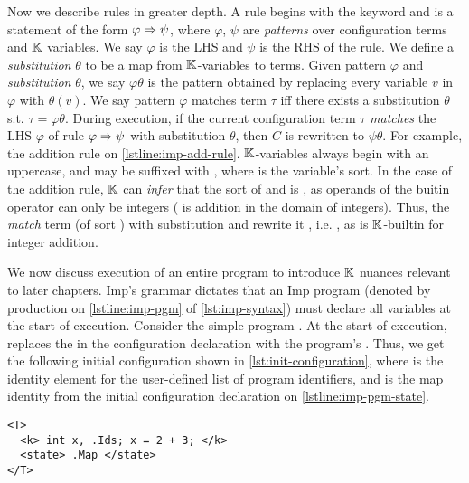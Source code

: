 Now we describe rules in greater depth.
A rule begins with the keyword 
and is a statement of the form $\varphi \Rightarrow \psi$, where
$\varphi$, $\psi$ are \emph{patterns} over configuration terms and $\mathbb{K}$ variables.
We say $\varphi$ is the LHS and $\psi$ is the RHS of the rule.
We define a \emph{substitution} $\theta$ to be a map from $\mathbb{K}$-variables to terms.
Given pattern $\varphi$ and \emph{substitution} $\theta$, we say
$\varphi\theta$ is the pattern obtained by replacing every variable $v$ in
$\varphi$ with $\theta(v)$. We say pattern $\varphi$ matches
term $\tau$ iff there exists a substitution $\theta$ s.t. $\tau = \varphi\theta$.
During execution, if the current configuration term
$\tau$ \emph{matches} the LHS $\varphi$ of rule $\varphi \Rightarrow \psi$
with substitution $\theta$, then $C$ is rewritten to $\psi\theta$.
For example, the addition rule on \autoref{lstline:imp-add-rule}.
$\mathbb{K}$-variables always begin with an uppercase, and may be suffixed with
, where  is the variable's sort. In the case
of the addition rule, $\mathbb{K}$ can \emph{infer} that the sort of
 and  is , as operands of the
buitin operator  can only be integers (
is addition in the domain of integers). Thus, the \LHS{} 
\emph{match} term  (of sort )
with substitution
 and rewrite it , i.e. , as
 is $\mathbb{K}$-builtin for integer addition.

We now discuss execution of an entire program to introduce $\mathbb{K}{}$ nuances
relevant to later chapters. Imp's grammar dictates that an
Imp program (denoted by production  on
\autoref{lstline:imp-pgm} of \autoref{lst:imp-syntax})
must declare all variables at the start of execution. Consider
the simple program .
At the start of execution, \K{} replaces the 
in the configuration declaration with the program's \AST{}.
Thus, we get the following initial configuration shown in
\autoref{lst:init-configuration}, where  is the identity element for the user-defined
list of program identifiers, and  is the map identity
from the initial configuration declaration on \autoref{lstline:imp-pgm-state}.

\begin{lstlisting}[float=h!
  ,language=k
  ,style=ksty
  ,frame=single
  ,label=lst:init-configuration
  ,caption=Initial Execution Configuration]
<T>
  <k> int x, .Ids; x = 2 + 3; </k>
  <state> .Map </state>
</T>
\end{lstlisting}

